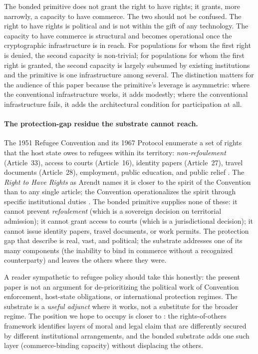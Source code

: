 \documentclass[11pt,a4paper]{article}
\theoremstyle{remark}
\begin{document}
The bonded primitive does not grant the right to have rights; it
grants, more narrowly, a capacity to have commerce. The two
should not be confused. The right to have rights is political and
is not within the gift of any technology. The capacity to have
commerce is structural and becomes operational once the
cryptographic infrastructure is in reach. For populations for
whom the first right is denied, the second capacity is
non-trivial; for populations for whom the first right is granted,
the second capacity is largely subsumed by existing institutions
and the primitive is one infrastructure among several. The
distinction matters for the audience of this paper because the
primitive's leverage is asymmetric: where the conventional
infrastructure works, it adds modestly; where the conventional
infrastructure fails, it adds the architectural condition for
participation at all.

\paragraph{The protection-gap residue the substrate cannot reach.}
The 1951 Refugee Convention and its 1967 Protocol enumerate a set
of rights that the host state owes to refugees within its
territory: \emph{non-refoulement} (Article~33), access to courts
(Article~16), identity papers (Article~27), travel documents
(Article~28), employment, public education, and public relief
\citep{refugee_convention_1951, goodwin_gill_mcadam_2021}. The
\emph{Right to Have Rights} as Arendt names it is closer to the
spirit of the Convention than to any single article; the
Convention operationalizes the spirit through specific institutional
duties \citep{kesby2012right, benhabib2004rights}. The bonded
primitive supplies none of these: it cannot prevent
\emph{refoulement} (which is a sovereign decision on territorial
admission); it cannot grant access to courts (which is a
jurisdictional decision); it cannot issue identity papers,
travel documents, or work permits. The protection gap that
\citeauthor{goodwin_gill_mcadam_2021} describe is real, vast, and
political; the substrate addresses one of its many components
(the inability to bind in commerce without a recognized
counterparty) and leaves the others where they were.

A reader sympathetic to refugee policy should take this honestly:
the present paper is not an argument for de-prioritizing the
political work of Convention enforcement, host-state obligations,
or international protection regimes. The substrate is a
\emph{useful adjunct} where it works, not a substitute for the
broader regime. The position we hope to occupy is closer to
\citeauthor{benhabib2004rights}: the rights-of-others framework
identifies layers of moral and legal claim that are differently
secured by different institutional arrangements, and the bonded
substrate adds one such layer (commerce-binding capacity) without
displacing the others.
\end{document}
